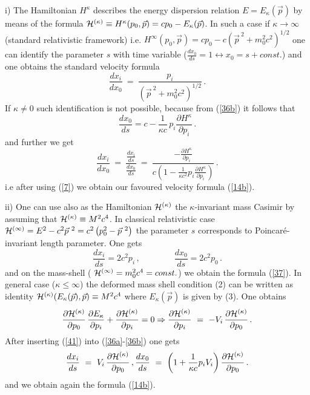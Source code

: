 \documentclass[a4paper,12pt]{article}
\begin{document}
i) The Hamiltonian $ { H}^{\kappa}$ describes the energy
dispersion relation $ E=E_{\kappa} (\vec{p} )$ by means of the
formula $ {\cal H}^{(\kappa)} \equiv { H}^{\kappa}(p_0 , \vec{p}
)= c p_0 - E_\kappa (\vec{p} )$. In such a case if $\kappa \to
\infty$ (standard relativistic framework) i.e. $H^{\infty}(p_0 ,
\vec{p} )= c p_0 - c(\vec{p}^{ \ 2} + m^2_0 c^2 )^{1/2} $ one can
identify the parameter $s$ with time variable ($\frac{dx_0}{ds}= 1
\longleftrightarrow x_0 = s+ const. $) and one obtains the
standard velocity formula
\begin{equation}\label{37}
\frac{dx_i}{dx_0} \ = \ \frac{p_i}{(\vec{p}^{\ 2} + m^2_0
c^2)^{1/2}} \, .
\end{equation}
If $\kappa \neq 0$ such identification is not possible, because
from (\ref{36b}) it follows that
\begin{equation}\label{38}
\frac{dx_0}{ds}= c - \frac{1}{\kappa c} \, p_i \frac{\partial
H^\kappa}{\partial p_i}\, .
\end{equation}
and further we get
\begin{equation}\label{39}
\frac{dx_i}{dx_0} \ = \ \frac{\frac{dx_i}{ds}}{\frac{dx_0}{ds}} \
= \ \frac{- \frac{\partial H^{\kappa}}{\partial p_i}}{c\left(1 -
\frac{1}{\kappa c^2} p _i \frac{\partial H^{\kappa}}{\partial
p_i}\right) }\, .
\end{equation}
i.e after using  (\ref{7}) we obtain our favoured velocity formula
(\ref{14b}).

ii) One can use also as the Hamiltonian ${\cal H}^{(\kappa)} $ the
$\kappa$-invariant mass Casimir  by assuming that $ {\cal
H}^{(\kappa)}\equiv M^2 c^4$. In classical relativistic case $
{\cal H}^{(\infty)}= E^2  - c^2 \vec{p}^{\ 2}= c^2\left(p_0^2 -
\vec{p}^{\ 2}\right) $ the parameter $s$
 corresponds to Poincar\'{e}-invariant length parameter. One gets
\begin{equation}\label{40}
\frac{dx_i}{ds}= 2 c^2 p_i \, , \qquad \qquad \frac{dx_0}{ds}= 2
c^2 p_0 \, .
\end{equation}
and on the mass-shell ( ${\cal H}^{(\infty)} = m^2_0 c^4 = const.
$) we obtain the formula (\ref{37}). In general case ($\kappa \leq
\infty $) the deformed mass shell condition (2) can be written as
identity ${\cal H}^{(\kappa)}(E_\kappa(\vec{p}), \vec{p})\equiv
M^2 c^4$ where $E_\kappa(\vec{p})$ is given by (3). One obtains
\begin{equation}\label{41}
\frac{\partial {\cal H}^{(\kappa)}}{\partial p_0} \,
\frac{\partial { E}_{\kappa}}{\partial p_i} + \frac{\partial {\cal
H}^{(\kappa)}}{\partial p_i} = 0 \Rightarrow \frac{\partial {\cal
H }^{(\kappa)}}{\partial p_i} \ = \ - V_i\, \frac{\partial {\cal
H}^{(\kappa)}}{\partial p_0} \, .
\end{equation}
After inserting (\ref{41}) into (\ref{36a}-\ref{36b}) one gets
\begin{equation}\label{42}
\frac{dx_i}{ds} \ = \ V_i\,\frac{\partial {\cal
H}^{(\kappa)}}{\partial p_0}\, , \frac{dx_0}{ds} \ = \ \left(1 +
\frac{1}{\kappa c} p_i V_i\right)\frac{\partial {\cal
H}^{(\kappa)}}{\partial p_0} \, .
\end{equation}
and we obtain again the formula (\ref{14b}).
\end{document}
